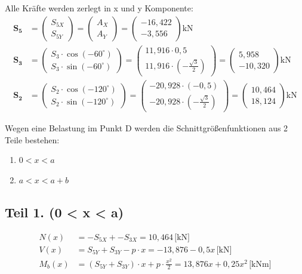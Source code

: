Alle Kräfte werden zerlegt in x und y Komponente:
\begin{align*}
  \mathbf{S_5} &=
  \begin{pmatrix} S_{5X} \\ S_{5Y}
  \end{pmatrix}
  =
  \begin{pmatrix} A_X \\ A_Y
  \end{pmatrix}
  =
  \begin{pmatrix} -16{,}422 \\ -3{,}556
  \end{pmatrix} \text{kN} \\[2ex]
  \mathbf{S_3} &=
  \begin{pmatrix} S_3 \cdot \cos(-60^\circ) \\ S_3 \cdot \sin(-60^\circ)
  \end{pmatrix}
  =
  \begin{pmatrix} 11{,}916 \cdot 0{,}5 \\ 11{,}916 \cdot \left(-\frac{\sqrt{3}}{2}\right)
  \end{pmatrix}
  =
  \begin{pmatrix} 5{,}958 \\ -10{,}320
  \end{pmatrix} \text{kN} \\[2ex]
  \mathbf{S_2} &=
  \begin{pmatrix} S_2 \cdot \cos(-120^\circ) \\ S_2 \cdot \sin(-120^\circ)
  \end{pmatrix}
  =
  \begin{pmatrix} -20{,}928 \cdot (-0{,}5) \\ -20{,}928 \cdot \left(-\frac{\sqrt{3}}{2}\right)
  \end{pmatrix}
  =
  \begin{pmatrix} 10{,}464 \\ 18{,}124
  \end{pmatrix} \text{kN}
\end{align*}

Wegen eine Belastung im Punkt D werden die Schnittgrößenfunktionen aus 2 Teile bestehen:
\begin{enumerate}
  \item $0 < x < a$
  \item $a < x < a + b$
\end{enumerate}
\subsection{Teil 1. (0 < x < a)}
\begin{align*}
  N(x) &= -S_{5X} + -S_{3X} = 10,464 \, \text{[kN]} \\
  V(x) &= S_{5Y} + S_{3Y} - p \cdot x = -13,876 - 0,5x \, \text{[kN]} \\
  M_b(x) &= (S_{5Y} + S_{3Y}) \cdot x + p \cdot \frac{x^2}{2} = 13{,}876x + 0{,}25x^2 \, \text{[kNm]}
\end{align*}
